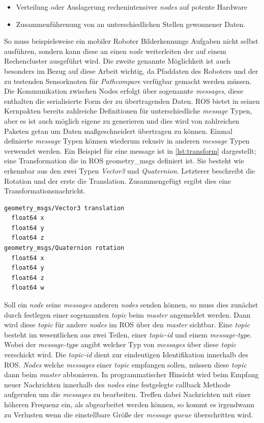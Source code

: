 \begin{itemize}
  \item Verteilung oder Auslagerung rechenintensiver \textit{nodes} auf potente Hardware
  \item Zusammenführenung von an unterschiedlichen Stellen gewonnener Daten.
\end{itemize}

So muss beispielsweise ein mobiler Roboter Bilderkennungs Aufgaben nicht selbst
ausführen, sondern kann diese an einen \textit{node} weiterleiten der auf einem
Rechencluster ausgeführt wird. Die zweite genannte Möglichkeit ist auch
besonders im Bezug auf diese Arbeit wichtig, da Pfaddaten des Roboters und der
zu testenden Sensorknoten für \textit{Pathcompare} verfügbar gemacht werden
müssen.  Die Kommunikation zwischen Nodes erfolgt über sogenannte
\textit{messages}, diese enthalten die serialisierte Form der zu übertragenden
Daten.  \gls{ROS} bietet in seinen Kernpakten bereits zahlreiche Definitionen
für unterschiedliche \textit{message} Typen, aber es ist auch möglich eigene zu
generieren und dies wird von zahlreichen Paketen getan um Daten maßgeschneidert
übertragen zu können. Einmal definierte \textit{message} Typen können wiederum
rekusiv in anderen \textit{message} Typen verwendet werden.  Ein Beispiel für
eine message ist in \autoref{lst:transform} dargestellt; eine Transformation
die in ROS geometry\_msgs definiert ist. Sie besteht wie erkennbar aus den zwei
Typen \textit{Vector3} und \textit{Quaternion}. Letzterer beschreibt die
Rotation und der erste die Translation. Zusammengefügt ergibt dies eine
Transformationsnachricht.

\begin{lstlisting}[caption=ROS transformation message, label=lst:transform]
geometry_msgs/Vector3 translation
  float64 x
  float64 y
  float64 z
geometry_msgs/Quaternion rotation
  float64 x
  float64 y
  float64 z
  float64 w
\end{lstlisting}

Soll ein \textit{node} seine \textit{messages} anderen \textit{nodes} senden
können, so muss dies zunächst durch festlegen einer sogenannten \textit{topic}
beim \textit{master} angemeldet werden. Dann wird diese \textit{topic} für
andere \textit{nodes} im \gls{ROS} über den \textit{master} sichtbar.  Eine
\textit{topic} besteht im wesentlichen aus zwei Teilen, einer \textit{topic-id}
und einem \textit{message-type}. Wobei der \textit{message-type} angibt welcher
Typ von \textit{messages} über diese \textit{topic} verschickt wird. Die
\textit{topic-id} dient zur eindeutigen Identifikation innerhalb des \gls{ROS}.
\textit{Nodes} welche \textit{messages} einer \textit{topic} empfangen sollen,
müssen diese \textit{topic} dann beim \textit{master} abbonieren. In
programmatischer Hinsicht wird beim Empfang neuer Nachrichten innerhalb des
\textit{nodes} eine festgelegte callback Methode aufgerufen um die
\textit{messages} zu bearbeiten. Treffen dabei Nachrichten mit einer höheren
Frequenz ein, als abgearbeitet werden können, so kommt es irgendwann zu
Verlusten wenn die einstellbare Größe der \textit{message queue} überschritten
wird.

